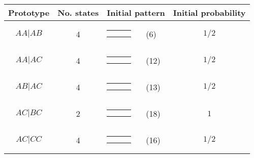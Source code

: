 \begin{center}
\begin{tabular}{ccrlc} \hline
Prototype & No. states & \multicolumn{2}{c}{Initial pattern} & Initial probability \\ \hline
$AA|AB$ & 4 & 
{\renewcommand{\arraystretch}{0.3}
\renewcommand{\tabcolsep}{0.5mm}
\parbox[b][3mm][c]{12mm}{
\begin{tabular}{|p{2mm}|p{2mm}||p{2mm}|} \hline
$\bullet$ &           &           \\
$\bullet$ & $\circ  $ &           \\ \hline
\end{tabular}}}
& (6) & $1/2$ \\
$AA|AC$ & 4 & 
{\renewcommand{\arraystretch}{0.3}
\renewcommand{\tabcolsep}{0.5mm}
\parbox[b][3mm][c]{12mm}{
\begin{tabular}{|p{2mm}|p{2mm}||p{2mm}|} \hline
$\bullet$ &           &           \\
$\bullet$ &           & $\circ  $ \\ \hline
\end{tabular}}}
& (12) & $1/2$ \\
$AB|AC$ & 4 & 
{\renewcommand{\arraystretch}{0.3}
\renewcommand{\tabcolsep}{0.5mm}
\parbox[b][3mm][c]{12mm}{
\begin{tabular}{|p{2mm}|p{2mm}||p{2mm}|} \hline
$\bullet$ &           &           \\
          & $\bullet$ & $\circ  $ \\ \hline
\end{tabular}}}
& (13) & $1/2$ \\
$AC|BC$ & 2 & 
{\renewcommand{\arraystretch}{0.3}
\renewcommand{\tabcolsep}{0.5mm}
\parbox[b][3mm][c]{12mm}{
\begin{tabular}{|p{2mm}|p{2mm}||p{2mm}|} \hline
          &           & $\bullet$ \\
$\bullet$ & $\circ  $ &           \\ \hline
\end{tabular}}}
& (18) & $1$ \\
$AC|CC$ & 4 & 
{\renewcommand{\arraystretch}{0.3}
\renewcommand{\tabcolsep}{0.5mm}
\parbox[b][3mm][c]{12mm}{
\begin{tabular}{|p{2mm}|p{2mm}||p{2mm}|} \hline
          &           & $\bullet$ \\
$\circ  $ &           & $\bullet$ \\ \hline
\end{tabular}}}
& (16) & $1/2$ \\
\hline
\end{tabular}
\end{center}

